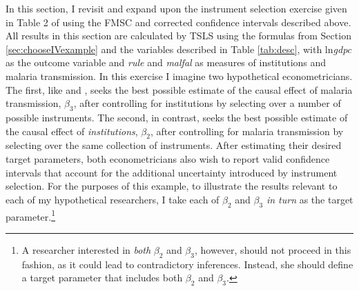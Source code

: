 In this section, I revisit and expand upon the instrument selection exercise given in Table 2 of \cite{Carstensen2006} using the FMSC and corrected confidence intervals described above. 
All results in this section are calculated by TSLS using the formulas from Section \ref{sec:chooseIVexample} and the variables described in Table \ref{tab:desc}, with ln\emph{gdpc} as the outcome  variable and \emph{rule} and \emph{malfal} as measures of institutions and malaria transmission.
In this exercise I imagine two hypothetical econometricians.
The first, like \cite{Sachs} and \cite{Carstensen2006}, seeks the best possible estimate of the causal effect of malaria transmission, $\beta_3$, after controlling for institutions by selecting over a number of possible instruments.
The second, in contrast, seeks the best possible estimate of the causal effect of \emph{institutions}, $\beta_2$, after controlling for malaria transmission by selecting over the same collection of instruments.
After estimating their desired target parameters, both econometricians also wish to report valid confidence intervals that account for the additional uncertainty introduced by instrument selection.
For the purposes of this example, to illustrate the results relevant to each of my hypothetical researchers, I take each of $\beta_2$ and $\beta_3$ \emph{in turn} as the target parameter.\footnote{A researcher interested in \emph{both} $\beta_2$ and $\beta_3$, however, should not proceed in this fashion, as it could lead to contradictory inferences. 
Instead, she should define a target parameter that includes both $\beta_2$ and $\beta_3$.}


